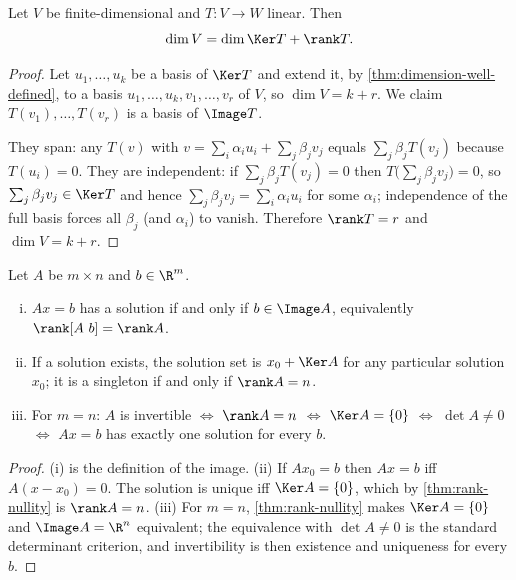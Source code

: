 \begin{theorem}\label{thm:rank-nullity}
	Let $V$ be finite-dimensional and $T\colon V\to W$ linear. Then
	\[
		\dim V=\dim\Ker T+\rank T .
	\]
\end{theorem}

\begin{proof}
	Let $u_1,\dots,u_k$ be a basis of $\Ker T$ and extend it, by
	\autoref{thm:dimension-well-defined}, to a basis
	$u_1,\dots,u_k,v_1,\dots,v_r$ of $V$, so $\dim V=k+r$. We claim
	$T(v_1),\dots,T(v_r)$ is a basis of $\Image T$.

	They span: any $T(v)$ with $v=\sum_i\alpha_iu_i+\sum_j\beta_jv_j$ equals
	$\sum_j\beta_jT(v_j)$ because $T(u_i)=0$. They are independent: if
	$\sum_j\beta_jT(v_j)=0$ then $T\bigl(\sum_j\beta_jv_j\bigr)=0$, so
	$\sum_j\beta_jv_j\in\Ker T$ and hence $\sum_j\beta_jv_j=\sum_i\alpha_iu_i$ for
	some $\alpha_i$; independence of the full basis forces all $\beta_j$ (and
	$\alpha_i$) to vanish. Therefore $\rank T=r$ and $\dim V=k+r$.
\end{proof}

\begin{corollary}[Solvability of $Ax=b$]\label{cor:solvability}
	Let $A$ be $m\times n$ and $b\in\R^m$.
	\begin{enumerate}[(i)]
		\item $Ax=b$ has a solution if and only if $b\in\Image A$, equivalently
		      $\rank[A\ b]=\rank A$.
		\item If a solution exists, the solution set is $x_0+\Ker A$ for any particular
		      solution $x_0$; it is a singleton if and only if $\rank A=n$.
		\item For $m=n$: $A$ is invertible $\iff$ $\rank A=n$ $\iff$ $\Ker A=\{0\}$
		      $\iff$ $\det A\neq0$ $\iff$ $Ax=b$ has exactly one solution for every $b$.
	\end{enumerate}
\end{corollary}

\begin{proof}
	(i) is the definition of the image. (ii) If $Ax_0=b$ then $Ax=b$ iff
	$A(x-x_0)=0$. The solution is unique iff $\Ker A=\{0\}$, which by
	\autoref{thm:rank-nullity} is $\rank A=n$. (iii) For $m=n$,
	\autoref{thm:rank-nullity} makes $\Ker A=\{0\}$ and $\Image A=\R^n$ equivalent;
	the equivalence with $\det A\neq0$ is the standard determinant criterion, and
	invertibility is then existence and uniqueness for every $b$.
\end{proof}

